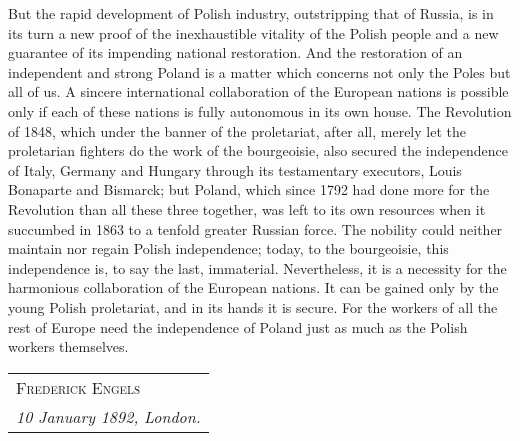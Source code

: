 But the rapid development of Polish industry, outstripping that of Russia, is in its turn a new proof of the inexhaustible vitality of the Polish people and a new guarantee of its impending national restoration. And the restoration of an independent and strong Poland is a matter which concerns not only the Poles but all of us. A sincere international collaboration of the European nations is possible only if each of these nations is fully autonomous in its own house. The Revolution of 1848, which under the banner of the proletariat, after all, merely let the proletarian fighters do the work of the bourgeoisie, also secured the independence of Italy, Germany and Hungary through its testamentary executors, Louis Bonaparte and Bismarck; but Poland, which since 1792 had done more for the Revolution than all these three together, was left to its own resources when it succumbed in 1863 to a tenfold greater Russian force. The nobility could neither maintain nor regain Polish independence; today, to the bourgeoisie, this independence is, to say the last, immaterial. Nevertheless, it is a necessity for the harmonious collaboration of the European nations. It can be gained only by the young Polish proletariat, and in its hands it is secure. For the workers of all the rest of Europe need the independence of Poland just as much as the Polish workers themselves.

\hfill
\begin{tabular}{@{}l@{}}
\scshape Frederick Engels \\
\emph{10 January 1892, London.}
\end{tabular}
